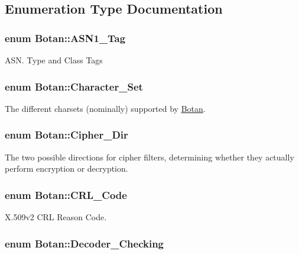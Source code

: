 \subsection{Enumeration Type Documentation}
\hypertarget{namespaceBotan_aaa08f67a945ef195fa39e62659dffa7a}{
\subsubsection[{A\-S\-N1\-\_\-\-Tag}]{\setlength{\rightskip}{0pt plus 5cm}enum {\bf Botan\-::\-A\-S\-N1\-\_\-\-Tag}}}\label{namespaceBotan_aaa08f67a945ef195fa39e62659dffa7a}
A\-S\-N. Type and Class Tags \hypertarget{namespaceBotan_a416eb1af7496d74b885a20ff833e9b33}{
\subsubsection[{Character\-\_\-\-Set}]{\setlength{\rightskip}{0pt plus 5cm}enum {\bf Botan\-::\-Character\-\_\-\-Set}}}\label{namespaceBotan_a416eb1af7496d74b885a20ff833e9b33}
The different charsets (nominally) supported by \hyperlink{namespaceBotan}{Botan}. \hypertarget{namespaceBotan_ad9d14ffdc73fc19966421979b32ee759}{
\subsubsection[{Cipher\-\_\-\-Dir}]{\setlength{\rightskip}{0pt plus 5cm}enum {\bf Botan\-::\-Cipher\-\_\-\-Dir}}}\label{namespaceBotan_ad9d14ffdc73fc19966421979b32ee759}
The two possible directions for cipher filters, determining whether they actually perform encryption or decryption. \hypertarget{namespaceBotan_a781d47b68b281fe5b934138d13de2dfc}{
\subsubsection[{C\-R\-L\-\_\-\-Code}]{\setlength{\rightskip}{0pt plus 5cm}enum {\bf Botan\-::\-C\-R\-L\-\_\-\-Code}}}\label{namespaceBotan_a781d47b68b281fe5b934138d13de2dfc}
X.\-509v2 C\-R\-L Reason Code. \hypertarget{namespaceBotan_acd5baf937a9984c39f8b44104dde76ae}{
\subsubsection[{Decoder\-\_\-\-Checking}]{\setlength{\rightskip}{0pt plus 5cm}enum {\bf Botan\-::\-Decoder\-\_\-\-Checking}}}\label{namespaceBotan_acd5baf937a9984c39f8b44104dde76ae}
